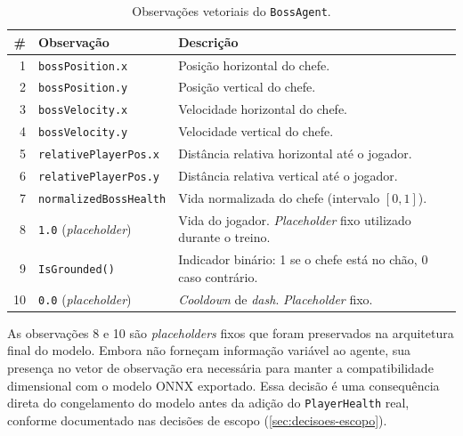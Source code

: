 \begin{table}[htb]
    \centering
    \caption{Observações vetoriais do \texttt{BossAgent}.}
    \label{tab:observacoes}
    \begin{tabular}{r l p{6.5cm}}
        \toprule
        \textbf{\#} & \textbf{Observação}     & \textbf{Descrição} \\
        \midrule
        1  & \texttt{bossPosition.x}           & Posição horizontal do chefe. \\
        2  & \texttt{bossPosition.y}           & Posição vertical do chefe. \\
        3  & \texttt{bossVelocity.x}           & Velocidade horizontal do chefe. \\
        4  & \texttt{bossVelocity.y}           & Velocidade vertical do chefe. \\
        5  & \texttt{relativePlayerPos.x}      & Distância relativa horizontal
                                                 até o jogador. \\
        6  & \texttt{relativePlayerPos.y}      & Distância relativa vertical
                                                 até o jogador. \\
        7  & \texttt{normalizedBossHealth}      & Vida normalizada do chefe
                                                 (intervalo $[0, 1]$). \\
        8  & \texttt{1.0} (\textit{placeholder}) & Vida do jogador.
                                                 \textit{Placeholder} fixo
                                                 utilizado durante o treino. \\
        9  & \texttt{IsGrounded()}              & Indicador binário: 1 se o
                                                 chefe está no chão, 0 caso
                                                 contrário. \\
        10 & \texttt{0.0} (\textit{placeholder}) & \textit{Cooldown} de
                                                 \textit{dash}.
                                                 \textit{Placeholder} fixo. \\
        \bottomrule
    \end{tabular}
\end{table}

As observações 8 e 10 são \textit{placeholders} fixos que foram preservados
na arquitetura final do modelo. Embora não forneçam informação variável ao
agente, sua presença no vetor de observação era necessária para manter a
compatibilidade dimensional com o modelo ONNX exportado. Essa decisão é uma
consequência direta do congelamento do modelo antes da adição do
\texttt{PlayerHealth} real, conforme documentado nas decisões de escopo
(\autoref{sec:decisoes-escopo}).

